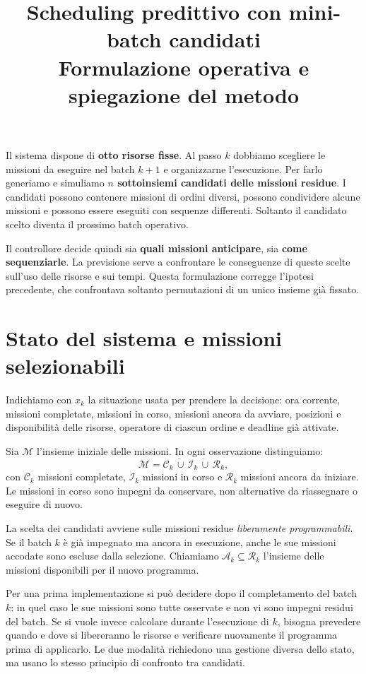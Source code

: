 \documentclass[a4paper,11pt]{article}
\title{Scheduling predittivo con mini-batch candidati\\\large Formulazione operativa e spiegazione del metodo}
\author{}
\date{}
\begin{document}
\maketitle
\vspace{-1.5em}

Il sistema dispone di \textbf{otto risorse fisse}. Al passo $k$ dobbiamo scegliere le missioni da eseguire nel batch $k+1$ e organizzarne l'esecuzione. Per farlo generiamo e simuliamo \textbf{$n$ sottoinsiemi candidati delle missioni residue}. I candidati possono contenere missioni di ordini diversi, possono condividere alcune missioni e possono essere eseguiti con sequenze differenti. Soltanto il candidato scelto diventa il prossimo batch operativo.

Il controllore decide quindi sia \textbf{quali missioni anticipare}, sia \textbf{come sequenziarle}. La previsione serve a confrontare le conseguenze di queste scelte sull'uso delle risorse e sui tempi. Questa formulazione corregge l'ipotesi precedente, che confrontava soltanto permutazioni di un unico insieme già fissato.

\section{Stato del sistema e missioni selezionabili}

Indichiamo con $x_k$ la situazione usata per prendere la decisione: ora corrente, missioni completate, missioni in corso, missioni ancora da avviare, posizioni e disponibilità delle risorse, operatore di ciascun ordine e deadline già attivate.

Sia $\mathcal{M}$ l'insieme iniziale delle missioni. In ogni osservazione distinguiamo:
\begin{equation}
    \mathcal{M}=\mathcal{C}_k\,\dot\cup\,\mathcal{I}_k\,\dot\cup\,\mathcal{R}_k,
\end{equation}
con $\mathcal{C}_k$ missioni completate, $\mathcal{I}_k$ missioni in corso e $\mathcal{R}_k$ missioni ancora da iniziare. Le missioni in corso sono impegni da conservare, non alternative da riassegnare o eseguire di nuovo.

La scelta dei candidati avviene sulle missioni residue \emph{liberamente programmabili}. Se il batch $k$ è già impegnato ma ancora in esecuzione, anche le sue missioni accodate sono escluse dalla selezione. Chiamiamo $\mathcal{A}_k\subseteq\mathcal{R}_k$ l'insieme delle missioni disponibili per il nuovo programma.

Per una prima implementazione si può decidere dopo il completamento del batch $k$: in quel caso le sue missioni sono tutte osservate e non vi sono impegni residui del batch. Se si vuole invece calcolare durante l'esecuzione di $k$, bisogna prevedere quando e dove si libereranno le risorse e verificare nuovamente il programma prima di applicarlo. Le due modalità richiedono una gestione diversa dello stato, ma usano lo stesso principio di confronto tra candidati.
\end{document}

